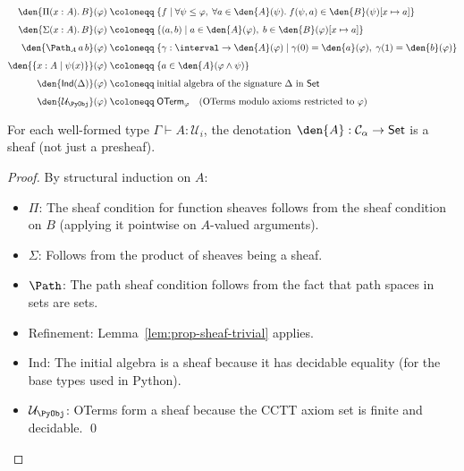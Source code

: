 \begin{align*}
  \den{\Pi(x : A).\, B}(\varphi)
  &\;\coloneqq\;
  \{f \mid \forall \psi \leq \varphi,\; \forall a \in \den{A}(\psi).\;
    f(\psi, a) \in \den{B}(\psi)[x \mapsto a]\} \\[4pt]
  \den{\Sigma(x : A).\, B}(\varphi)
  &\;\coloneqq\;
  \{(a, b) \mid a \in \den{A}(\varphi),\;
    b \in \den{B}(\varphi)[x \mapsto a]\} \\[4pt]
  \den{\Path_A\, a\, b}(\varphi)
  &\;\coloneqq\;
  \{\gamma : \interval \to \den{A}(\varphi) \mid
    \gamma(0) = \den{a}(\varphi),\; \gamma(1) = \den{b}(\varphi)\} \\[4pt]
  \den{\{x : A \mid \psi(x)\}}(\varphi)
  &\;\coloneqq\;
  \{a \in \den{A}(\varphi \wedge \psi)\} \\[4pt]
  \den{\mathsf{Ind}(\Delta)}(\varphi)
  &\;\coloneqq\;
  \text{initial algebra of the signature } \Delta \text{ in }
  \mathsf{Set} \\[4pt]
  \den{\mathcal{U}_\PyObj}(\varphi)
  &\;\coloneqq\;
  \mathsf{OTerm}_\varphi
  \quad\text{(OTerms modulo axioms restricted to } \varphi\text{)}
\end{align*}

\begin{proposition}
For each well-formed type \(\Gamma \vdash A : \mathcal{U}_i\),
the denotation \(\den{A} : \mathcal{C}_\alpha \to \mathsf{Set}\)
is a sheaf (not just a presheaf).
\end{proposition}

\begin{proof}
By structural induction on \(A\):
\begin{itemize}
\item \(\Pi\): The sheaf condition for function sheaves follows from
  the sheaf condition on \(B\) (applying it pointwise on \(A\)-valued
  arguments).
\item \(\Sigma\): Follows from the product of sheaves being a sheaf.
\item \(\Path\): The path sheaf condition follows from the fact that
  path spaces in sets are sets.
\item Refinement: Lemma~\ref{lem:prop-sheaf-trivial} applies.
\item \(\mathrm{Ind}\): The initial algebra is a sheaf because
  it has decidable equality (for the base types used in Python).
\item \(\mathcal{U}_\PyObj\): OTerms form a sheaf because the
  CCTT axiom set is finite and decidable.
\qed
\end{itemize}
\end{proof}



